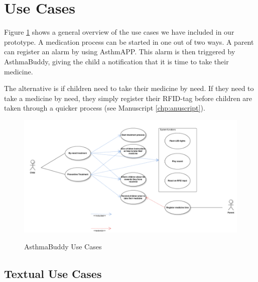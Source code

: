 \section{Use Cases}
Figure \ref{fig:pi-use-cases} shows a general overview of the use cases we have included in our prototype. A medication process can be started in one out of two ways. 
A parent can register an alarm by using AsthmAPP. This alarm is then triggered by AsthmaBuddy, giving the child a notification that it is time to take their medicine.

The alternative is if children need to take their medicine by need. If they need to take a medicine by need, they simply register their RFID-tag before children are taken through a quicker process (see Manuscript \ref{chp:anuscript}).  

\begin{figure}[H] 
	\centering
		\includegraphics[width=0.8\paperwidth]{Pictures/usecases.png}
	\label{fig:pi-use-cases}
	\caption{AsthmaBuddy Use Cases}
\end{figure}

\subsection{Textual Use Cases}

